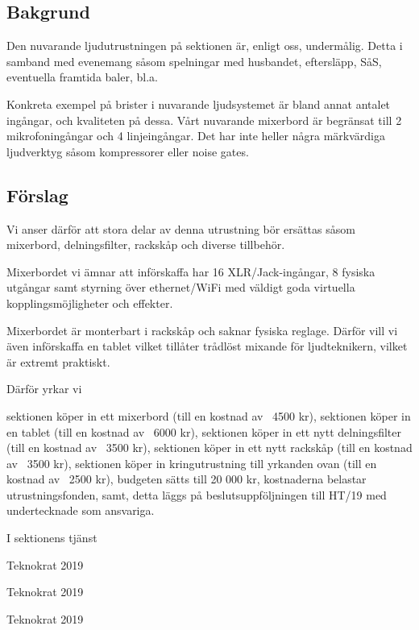 \documentclass[../_main/handlingar.tex]{subfiles}
\begin{document}

\subsection*{Bakgrund}
    Den nuvarande ljudutrustningen på sektionen är, enligt oss, undermålig. Detta i samband med evenemang såsom spelningar med husbandet, eftersläpp, SåS, eventuella framtida baler, bl.a. 
    
    Konkreta exempel på brister i nuvarande ljudsystemet är bland annat antalet ingångar, och kvaliteten på dessa. Vårt nuvarande mixerbord är begränsat till 2 mikrofoningångar och 4 linjeingångar. Det har inte heller några märkvärdiga ljudverktyg såsom kompressorer eller noise gates. 

    \subsection*{Förslag}
    Vi anser därför att stora delar av denna utrustning bör ersättas såsom mixerbord, delningsfilter, rackskåp och diverse tillbehör. 



    Mixerbordet vi ämnar att införskaffa har 16 XLR/Jack-ingångar, 8 fysiska utgångar samt styrning över ethernet/WiFi med väldigt goda virtuella kopplingsmöjligheter och effekter. 

    Mixerbordet är monterbart i rackskåp och saknar fysiska reglage. Därför vill vi även införskaffa en tablet vilket tillåter trådlöst mixande för ljudteknikern, vilket är extremt praktiskt. 

Därför yrkar vi
    \begin{attsatser}
       \att sektionen köper in ett mixerbord (till en kostnad av ~4500 kr),
       \att sektionen köper in en tablet (till en kostnad av ~6000 kr),
       \att sektionen köper in ett nytt delningsfilter (till en kostnad av ~3500 kr),
       \att sektionen köper in ett nytt rackskåp (till en kostnad av ~3500 kr),
       \att sektionen köper in kringutrustning till yrkanden ovan (till en kostnad av ~2500 kr),
       \att budgeten sätts till 20 000 kr,
       \att kostnaderna belastar utrustningsfonden, samt, 
       \att detta läggs på beslutsuppföljningen till HT/19 med undertecknade som ansvariga.
    \end{attsatser}
    


\begin{signatures}{3}
        I  sektionens tjänst
        \signature{David Karlsson}{Teknokrat 2019}
        \signature{Emil P. Lundh}{Teknokrat 2019}
        \signature{Moa Rönnlund}{Teknokrat 2019}
    \end{signatures}
\end{document}
